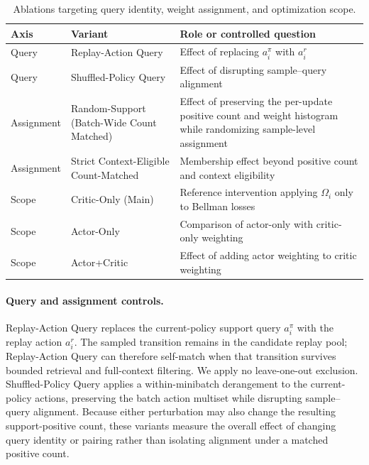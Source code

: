 \documentclass[letterpaper]{article}
\begin{document}
\begin{table}[t]
\centering
\small
\caption{Ablations targeting query identity, weight assignment, and optimization scope.}
\label{tab:mechanism-scope-ablations}
\begin{tabular}{>{\raggedright\arraybackslash}p{}>{\raggedright\arraybackslash}p{}>{\raggedright\arraybackslash}p{}}
\toprule
Axis & Variant & Role or controlled question \\
\midrule
Query & Replay-Action Query & Effect of replacing \(a_i^\pi\) with \(a_i^r\) \\
Query & Shuffled-Policy Query & Effect of disrupting sample--query alignment \\
\midrule
Assignment & Random-Support (Batch-Wide Count Matched) & Effect of preserving the per-update positive count and weight histogram while randomizing sample-level assignment \\
Assignment & Strict Context-Eligible Count-Matched & Membership effect beyond positive count and context eligibility \\
\midrule
Scope & Critic-Only (Main) & Reference intervention applying \(\Omega_i\) only to Bellman losses \\
Scope & Actor-Only & Comparison of actor-only with critic-only weighting \\
Scope & Actor+Critic & Effect of adding actor weighting to critic weighting \\
\bottomrule
\end{tabular}
\end{table}

\paragraph{Query and assignment controls.}
Replay-Action Query replaces the current-policy support query \(a_i^\pi\) with the replay action \(a_i^r\). The sampled transition remains in the candidate replay pool; Replay-Action Query can therefore self-match when that transition survives bounded retrieval and full-context filtering. We apply no leave-one-out exclusion. Shuffled-Policy Query applies a within-minibatch derangement to the current-policy actions, preserving the batch action multiset while disrupting sample--query alignment. Because either perturbation may also change the resulting support-positive count, these variants measure the overall effect of changing query identity or pairing rather than isolating alignment under a matched positive count.
\end{document}
